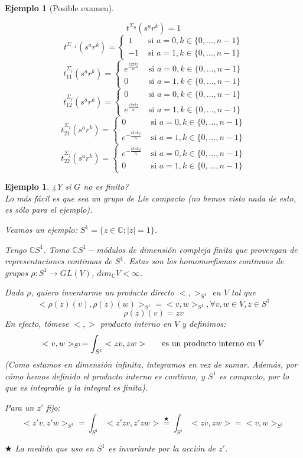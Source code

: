 \documentclass[11pt,a4paper]{article}
\theoremstyle{break}
\newtheorem{example}[theorem]{Ejemplo}
\begin{document}
\begin{example}[Posible examen]
\begin{enumerate}
$$t^{\Sigma_{0}} (s^{a}r^{k}) = 1$$
$$t^{\Sigma_{-1}} (s^{a}r^{k}) = \begin{cases}
1 & \text{ si } a = 0,  k \in \{0, \dots, n-1\} \\
-1 & \text{ si } a = 1, k \in \{0, \dots, n-1\}
\end{cases}$$
$$t_{11}^{\Sigma_{j}} (s^{a}r^{k}) = \begin{cases}
e^{\frac{i 2 \pi k j}{n}} & \text{ si } a = 0,  k \in \{0, \dots, n-1\} \\
0 & \text{ si } a = 1, k \in \{0, \dots, n-1\}
\end{cases}$$
$$t_{12}^{\Sigma_{j}} (s^{a}r^{k}) = \begin{cases}
0 & \text{ si } a = 0,  k \in \{0, \dots, n-1\} \\
e^{\frac{i 2 \pi k j}{n}} & \text{ si } a = 1, k \in \{0, \dots, n-1\}
\end{cases}$$
$$t_{21}^{\Sigma_{j}} (s^{a}r^{k}) = \begin{cases}
0 & \text{ si } a = 0,  k \in \{0, \dots, n-1\} \\
e^{-\frac{i 2 \pi k j}{n}} & \text{ si } a = 1, k \in \{0, \dots, n-1\}
\end{cases}$$
$$t_{22}^{\Sigma_{j}} (s^{a}r^{k}) = \begin{cases}
e^{-\frac{i 2 \pi k j}{n}} & \text{ si } a = 0,  k \in \{0, \dots, n-1\} \\
0 & \text{ si } a = 1, k \in \{0, \dots, n-1\}
\end{cases}$$
\end{enumerate}
\end{example}

\begin{example}
¿Y si $G$ no es finito? \\
Lo más fácil es que sea un grupo de Lie compacto (no hemos visto nada de esto, es sólo para el ejemplo).

Veamos un ejemplo: $S^{1} = \{z \in \mathbb{C}: |z| = 1\}$.

Tengo $\mathbb{C}S^{1}$. Tomo $\mathbb{C}S^{1}-$módulos de dimensión compleja finita que provengan de representaciones continuas de $S^{1}$. Estas son los homomorfismos continuos de grupos $\rho: S^{1} \to GL(V)$, $dim_{\mathbb{C}}V < \infty$.

Dada $\rho$, quiero inventarme un producto directo $<, >_{S^{1}}$ en $V$ tal que 
$$<\rho(z)(v), \rho(z)(w)>_{S^{1}} = <v, w>_{S^{1}}, \forall v, w \in V, z \in S^{1}$$
$$\rho(z)(v) = zv$$
En efecto, tómese $<,>$ producto interno en $V$ y definimos:
$$<v, w>_{S^{1}} = \int_{S^{1}} <zv, zw> \hspace{0.5cm} \text{ es un producto interno en } V $$
(Como estamos en dimensión infinita, integramos en vez de sumar. Además, por cómo hemos definido el producto interno es continuo, y $S^{1}$ es compacto, por lo que es integrable y la integral es finita).

Para un $z'$ fijo:
$$<z'v, z'w>_{S^{1}} = \int_{S^{1}} <z'zv, z'zw> \overset{\bigstar}{=} \int_{S^{1}} <zv, zw> = <v, w>_{S^{1}}$$

$\bigstar$ La medida que uso en $S^{1}$ es invariante por la acción de $z'$.
\end{example}
\end{document}
